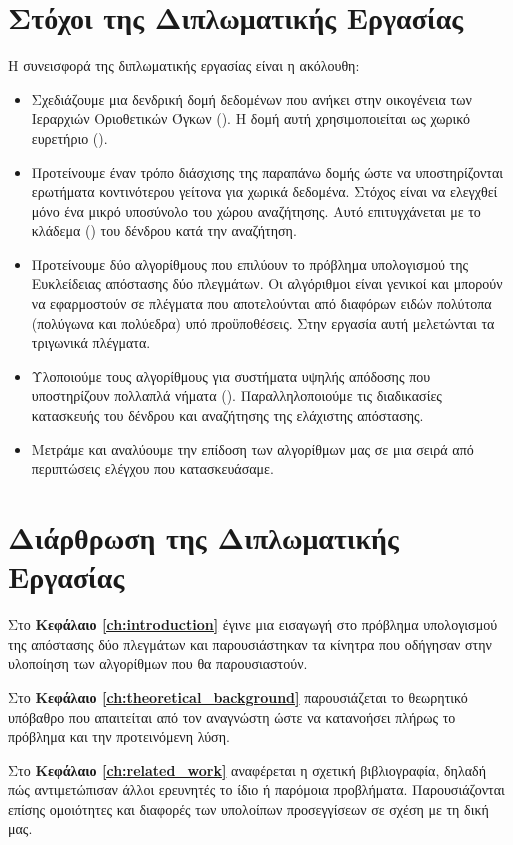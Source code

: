 \section{Στόχοι της Διπλωματικής Εργασίας}
Η συνεισφορά της διπλωματικής εργασίας είναι η ακόλουθη:
\begin{itemize}
    \item Σχεδιάζουμε μια δενδρική δομή δεδομένων που ανήκει στην 
    οικογένεια των Ιεραρχιών Οριοθετικών Όγκων (). Η δομή 
    αυτή χρησιμοποιείται ως χωρικό ευρετήριο ().
    \item Προτείνουμε έναν τρόπο διάσχισης της παραπάνω δομής ώστε 
    να υποστηρίζονται ερωτήματα κοντινότερου γείτονα για χωρικά 
    δεδομένα. Στόχος είναι να ελεγχθεί μόνο ένα μικρό υποσύνολο του 
    χώρου αναζήτησης. Αυτό επιτυγχάνεται με το κλάδεμα ()
    του δένδρου κατά την αναζήτηση.
    \item Προτείνουμε δύο αλγορίθμους που επιλύουν το πρόβλημα 
    υπολογισμού της Ευκλείδειας απόστασης δύο πλεγμάτων. 
    Οι αλγόριθμοι είναι γενικοί και μπορούν να εφαρμοστούν σε 
    πλέγματα που αποτελούνται από διαφόρων ειδών πολύτοπα (πολύγωνα και 
    πολύεδρα) υπό προϋποθέσεις. Στην εργασία αυτή μελετώνται τα 
    τριγωνικά πλέγματα.
    \item Υλοποιούμε τους αλγορίθμους για συστήματα υψηλής απόδοσης 
    που υποστηρίζουν πολλαπλά νήματα (). 
    Παραλληλοποιούμε τις διαδικασίες κατασκευής του δένδρου και
    αναζήτησης της ελάχιστης απόστασης.
    \item Μετράμε και αναλύουμε την επίδοση των αλγορίθμων μας 
    σε μια σειρά από περιπτώσεις ελέγχου που κατασκευάσαμε. 
\end{itemize}

\section{Διάρθρωση της Διπλωματικής Εργασίας}
Στο \textbf{Κεφάλαιο \ref{ch:introduction}} έγινε μια εισαγωγή στο 
πρόβλημα υπολογισμού της απόστασης δύο πλεγμάτων και παρουσιάστηκαν
τα κίνητρα που οδήγησαν στην υλοποίηση των αλγορίθμων που θα 
παρουσιαστούν. 

Στο \textbf{Κεφάλαιο \ref{ch:theoretical_background}} παρουσιάζεται το 
θεωρητικό υπόβαθρο που απαιτείται από τον αναγνώστη ώστε να κατανοήσει
πλήρως το πρόβλημα και την προτεινόμενη λύση.

Στο \textbf{Κεφάλαιο \ref{ch:related_work}} αναφέρεται η σχετική 
βιβλιογραφία, δηλαδή πώς αντιμετώπισαν άλλοι ερευνητές το ίδιο ή 
παρόμοια προβλήματα. 
Παρουσιάζονται επίσης ομοιότητες και διαφορές
των υπολοίπων προσεγγίσεων σε σχέση με τη δική μας.

